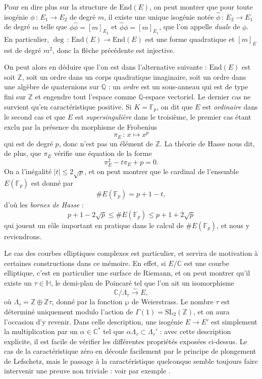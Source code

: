 \documentclass[11pt,a4paper]{article}
\newcommand{\Z}{\mathbb{Z}}
\newcommand{\C}{\mathbb{C}}
\newcommand{\F}{\mathbb{F}}
\newcommand{\Q}{\mathbb{Q}}
\renewcommand{\H}{\mathbb{H}}
\newcommand{\vers}{\longrightarrow}
\newcommand{\End}{\mathrm{End}}
\newcommand{\de}{\,:\,}
\theoremstyle{definition}
\begin{document}
Pour en dire plus sur la structure de $\End(E)$, on peut montrer que pour toute isogénie $\phi\de E_1\vers E_2$ de degré $m$, il existe une unique isogénie notée $\widehat{\phi}\de E_2\vers E_1$ de degré $m$ telle que $\phi\widehat{\phi}=[m]_{E_2}$ et $\widehat{\phi}\phi=[m]_{E_1}$, que l'on appelle \emph{duale} de $\phi$. En particulier, $\deg \de\End(E)\vers \End(E)$ est une forme quadratique et $[m]_E$ est de degré $m^2$, donc la flèche précédente est injective.

On peut alors en déduire que l'on est dans l'alternative suivante : $\End(E)$ est soit $\Z$, soit un ordre dans un corps quadratique imaginaire, soit un ordre dans une algèbre de quaternions sur $\Q$ : un \emph{ordre} est un sous-anneau qui est de type fini sur $\Z$ et engendre tout l'espace comme $\Q$-espace vectoriel. Le dernier cas ne survient qu'en caractéristique positive. Si $K = \F_p$, on dit que $E$ est \emph{ordinaire} dans le second cas et que $E$ est \emph{supersingulière} dans le troisième, le premier cas étant exclu par la présence du morphisme de Frobenius
$$\pi_E\de x\mapsto x^p$$
qui est de degré $p$, donc n'est pas un élément de $\Z$. La théorie de Hasse nous dit, de plus, que $\pi_E$ vérifie une équation de la forme
$$\pi_E^2 - t \pi_E + p = 0.$$
On a l'inégalité $|t|\leq 2\sqrt{p}$, et on peut montrer que le cardinal de l'ensemble $E(\F_p)$ est donné par
$$\# E(\F_p) = p + 1 - t,$$
d'où les \emph{bornes de Hasse} :
$$p + 1 - 2\sqrt{p} \leq \#E(\F_p) \leq p + 1 + 2\sqrt{p}$$
qui jouent un rôle important en pratique dans le calcul de $\# E(\F_p)$, et nous y reviendrons.

Le cas des courbes elliptiques complexes est particulier, et servira de motivation à certaines constructions dans ce mémoire. En effet, si $E/\C$ est une courbe elliptique, c'est en particulier une surface de Riemann,  et on peut montrer qu'il existe un $\tau\in \H$, le demi-plan de Poincaré tel que l'on ait un isomorphisme
$$\C/\Lambda_\tau \overset{\sim}{\vers} E,$$
où $\Lambda_\tau = \Z\oplus \Z\tau$, donné par la fonction $\wp$ de Weierstrass. Le nombre $\tau$ est déterminé uniquement modulo l'action de $\Gamma(1) = \mathrm{SL}_2(\Z)$, et on aura l'occasion d'y revenir. Dans celle description, une isogénie $E\vers E'$ est simplement la multiplication par un $\alpha\in \C^*$ tel que $\alpha \Lambda_\tau \subset \Lambda_\tau'$ : avec cette description explicite, il est facile de vérifier les différentes propriétés exposées ci-dessus. Le cas de la caractéristique zéro en découle facilement par le principe de plongement de Lefschetz, mais le passage à la caractéristique quelconque semble toujours faire intervenir une preuve non triviale : voir par exemple \cite{Nekovar}.
\end{document}
